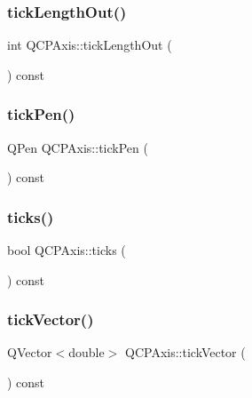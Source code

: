 \mbox{\label{class_q_c_p_axis_ad3ba6614ccddf351f133e0acdd4f021e}} 
\subsubsection{\texorpdfstring{tickLengthOut()}{tickLengthOut()}}
{\footnotesize\ttfamily int Q\+C\+P\+Axis\+::tick\+Length\+Out (\begin{DoxyParamCaption}{ }\end{DoxyParamCaption}) const}

\mbox{\label{class_q_c_p_axis_affd022d4f56dfc575b4ced95ad417860}} 
\subsubsection{\texorpdfstring{tickPen()}{tickPen()}}
{\footnotesize\ttfamily Q\+Pen Q\+C\+P\+Axis\+::tick\+Pen (\begin{DoxyParamCaption}{ }\end{DoxyParamCaption}) const\hspace{0.3cm}{\ttfamily [inline]}}

\mbox{\label{class_q_c_p_axis_a5c3da767a2dc990f200856a9e27ea06e}} 
\subsubsection{\texorpdfstring{ticks()}{ticks()}}
{\footnotesize\ttfamily bool Q\+C\+P\+Axis\+::ticks (\begin{DoxyParamCaption}{ }\end{DoxyParamCaption}) const\hspace{0.3cm}{\ttfamily [inline]}}

\mbox{\label{class_q_c_p_axis_a5aad9d6b34821ab0751dfc38dbc92a46}} 
\subsubsection{\texorpdfstring{tickVector()}{tickVector()}}
{\footnotesize\ttfamily Q\+Vector$<$double$>$ Q\+C\+P\+Axis\+::tick\+Vector (\begin{DoxyParamCaption}{ }\end{DoxyParamCaption}) const\hspace{0.3cm}{\ttfamily [inline]}}

